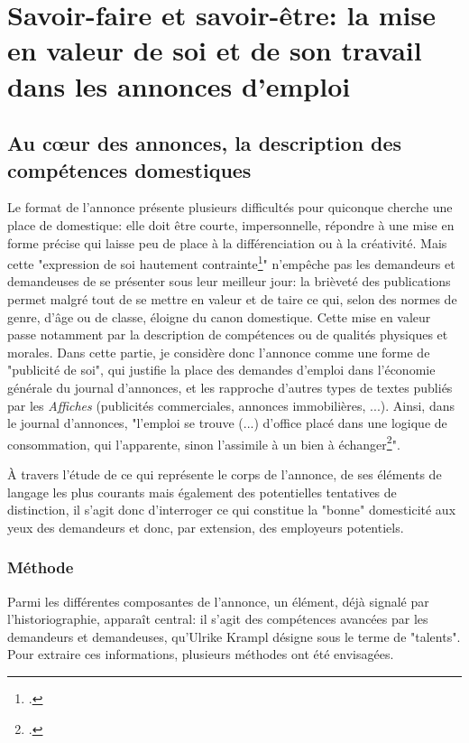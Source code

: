 \part{Savoir-faire et savoir-être: la mise en valeur de soi et de son travail dans les annonces d’emploi}



\chapter{Au cœur des annonces, la description des compétences domestiques}

Le format de l'annonce présente plusieurs difficultés pour quiconque cherche une place de domestique: elle doit être courte, impersonnelle, répondre à une mise en forme précise qui laisse peu de place à la différenciation ou à la créativité. Mais cette "expression de soi hautement contrainte\footcites{kramplPresseAnnoncesParisienne2020}" n'empêche pas les demandeurs et demandeuses de se présenter sous leur meilleur jour: la brièveté des publications permet malgré tout de se mettre en valeur et de taire ce qui, selon des normes de genre, d'âge ou de classe, éloigne du canon domestique. Cette mise en valeur passe notamment par la description de compétences ou de qualités physiques et morales. Dans cette partie, je considère donc l'annonce comme une forme de "publicité de soi", qui justifie la place des demandes d'emploi dans l'économie générale du journal d'annonces, et les rapproche d'autres types de textes publiés par les \textit{Affiches} (publicités commerciales, annonces immobilières, ...). Ainsi, dans le journal d'annonces, "l’emploi se trouve (...) d’office placé dans une logique de consommation, qui l’apparente, sinon l’assimile à un bien à échanger\footcites{kramplAdresserClercHuissier2017}". 

À travers l'étude de ce qui représente le corps de l'annonce, de ses éléments de langage les plus courants mais également des potentielles tentatives de distinction, il s'agit donc d'interroger ce qui constitue la "bonne" domesticité aux yeux des demandeurs et donc, par extension, des employeurs potentiels. 


\section{Méthode}

Parmi les différentes composantes de l'annonce, un élément, déjà signalé par l'historiographie, apparaît central: il s'agit des compétences avancées par les demandeurs et demandeuses, qu'Ulrike Krampl désigne sous le terme de "talents". Pour extraire ces informations, plusieurs méthodes ont été envisagées.

